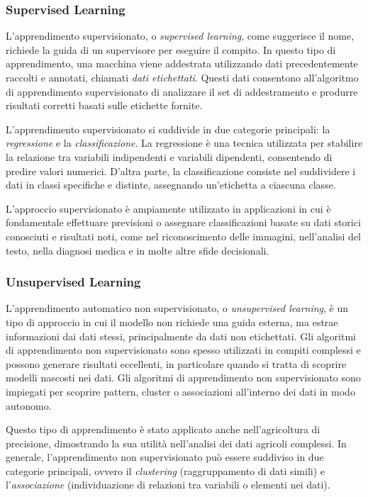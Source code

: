 \subsubsection{Supervised Learning}

L'apprendimento supervisionato, o \textit{supervised learning}, come suggerisce il nome, richiede la guida di un supervisore per eseguire il compito. In questo tipo di apprendimento, una macchina viene addestrata utilizzando dati precedentemente raccolti e annotati, chiamati \textit{dati etichettati}. Questi dati consentono all'algoritmo di apprendimento supervisionato di analizzare il set di addestramento e produrre risultati corretti basati sulle etichette fornite. 

L'apprendimento supervisionato si suddivide in due categorie principali: la \textit{regressione} e la \textit{classificazione}. La regressione è una tecnica utilizzata per stabilire la relazione tra variabili indipendenti e variabili dipendenti, consentendo di predire valori numerici. D'altra parte, la classificazione consiste nel suddividere i dati in classi specifiche e distinte, assegnando un'etichetta a ciascuna classe.

L'approccio supervisionato è ampiamente utilizzato in applicazioni in cui è fondamentale effettuare previsioni o assegnare classificazioni basate su dati storici conosciuti e risultati noti, come nel riconoscimento delle immagini, nell'analisi del testo, nella diagnosi medica e in molte altre sfide decisionali.

\subsubsection{Unsupervised Learning}

L'apprendimento automatico non supervisionato, o \textit{unsupervised learning}, è un tipo di approccio in cui il modello non richiede una guida esterna, ma estrae informazioni dai dati stessi, principalmente da dati non etichettati. Gli algoritmi di apprendimento non supervisionato sono spesso utilizzati in compiti complessi e possono generare risultati eccellenti, in particolare quando si tratta di scoprire modelli nascosti nei dati. Gli algoritmi di apprendimento non supervisionato sono impiegati per scoprire pattern, cluster o associazioni all'interno dei dati in modo autonomo.

Questo tipo di apprendimento è stato applicato anche nell'agricoltura di precisione, dimostrando la sua utilità nell'analisi dei dati agricoli complessi. In generale, l'apprendimento non supervisionato può essere suddiviso in due categorie principali, ovvero il \textit{clustering} (raggruppamento di dati simili) e l'\textit{associazione} (individuazione di relazioni tra variabili o elementi nei dati).


